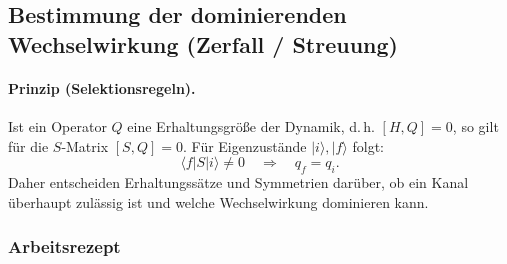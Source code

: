 \documentclass[10pt, letterpaper]{article}
\begin{document}

\subsection*{Bestimmung der dominierenden Wechselwirkung (Zerfall / Streuung)}

\paragraph{Prinzip (Selektionsregeln).}
Ist ein Operator $Q$ eine Erhaltungsgröße der Dynamik, d.\,h. $[H,Q]=0$, so gilt für die
$S$-Matrix $[S,Q]=0$. Für Eigenzustände $|i\rangle,|f\rangle$ folgt:
\[
\langle f|S|i\rangle\neq 0 \quad\Rightarrow\quad q_f=q_i .
\]
Daher entscheiden Erhaltungssätze und Symmetrien darüber, ob ein Kanal überhaupt
zulässig ist und welche Wechselwirkung dominieren kann.

\subsubsection*{Arbeitsrezept}
\end{document}
